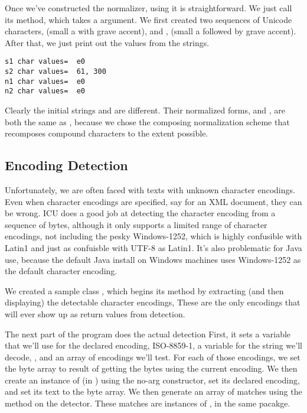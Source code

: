 Once we've constructed the normalizer, using it is straightforward.
We just call its  method, which takes a
 argument.  We first created two sequences of Unicode
characters,  (small a with grave accent), and
,  (small a followed by grave accent).
After that, we just print out the  values from the
strings.

\begin{verbatim}
s1 char values=  e0
s2 char values=  61, 300
n1 char values=  e0
n2 char values=  e0
\end{verbatim}
%
Clearly the initial strings  and  are different.
Their normalized forms,  and , are both the same as
, because we chose the composing normalization scheme that
recomposes compound characters to the extent possible.


\subsection{Encoding Detection}

Unfortunately, we are often faced with texts with unknown character
encodings.  Even when character encodings are specified, say for an
XML document, they can be wrong.  ICU does a good job at detecting the
character encoding from a sequence of bytes, although it only supports
a limited range of character encodings, not including the pesky
Windows-1252, which is highly confusible with Latin1 and just as
confuisble with UTF-8 as Latin1.  It's also problematic for Java use,
because the default Java install on Windows machines uses Windows-1252 as
the default character encoding.

We created a sample class , which begins its
 method by extracting (and then displaying) the detectable
character encodings,
%
%
These are the only encodings that will ever show up as return values
from detection.  

The next part of the program does the actual detection
%
%
First, it sets a variable that we'll use for the declared encoding,
ISO-8859-1, a variable for the string we'll decode,
, and an array of encodings we'll test.
For each of those encodings, we set the byte array  to result
of getting the bytes using the current encoding.  We then create an
instance of  (in ) using
the no-arg constructor, set its declared encoding, and set its text to
the byte array.  We then generate an array of matches using the
 method on the detector.  These matches are instances
of , in the same pacakge.  

